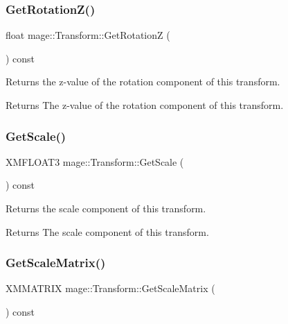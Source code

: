 \subsubsection{\texorpdfstring{Get\+Rotation\+Z()}{GetRotationZ()}}
{\footnotesize\ttfamily float mage\+::\+Transform\+::\+Get\+RotationZ (\begin{DoxyParamCaption}{ }\end{DoxyParamCaption}) const}

Returns the z-\/value of the rotation component of this transform.

\begin{DoxyReturn}{Returns}
The z-\/value of the rotation component of this transform. 
\end{DoxyReturn}
\hypertarget{structmage_1_1_transform_a38234d822ee1ffbbcfb2601a1d5f8475}{}\label{structmage_1_1_transform_a38234d822ee1ffbbcfb2601a1d5f8475} 
\subsubsection{\texorpdfstring{Get\+Scale()}{GetScale()}}
{\footnotesize\ttfamily X\+M\+F\+L\+O\+A\+T3 mage\+::\+Transform\+::\+Get\+Scale (\begin{DoxyParamCaption}{ }\end{DoxyParamCaption}) const}

Returns the scale component of this transform.

\begin{DoxyReturn}{Returns}
The scale component of this transform. 
\end{DoxyReturn}
\hypertarget{structmage_1_1_transform_ab78050be41abf1ab36d969d5235f97e2}{}\label{structmage_1_1_transform_ab78050be41abf1ab36d969d5235f97e2} 
\subsubsection{\texorpdfstring{Get\+Scale\+Matrix()}{GetScaleMatrix()}}
{\footnotesize\ttfamily X\+M\+M\+A\+T\+R\+IX mage\+::\+Transform\+::\+Get\+Scale\+Matrix (\begin{DoxyParamCaption}{ }\end{DoxyParamCaption}) const}


